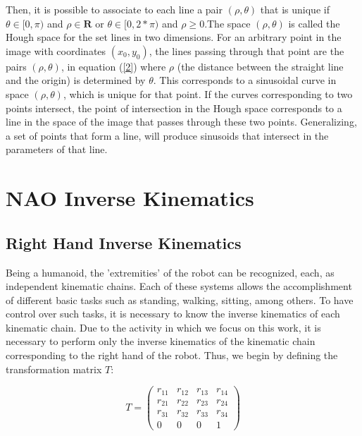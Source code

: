 \documentclass[conference]{IEEEtran}
\begin{document}
Then, it is possible to associate to each line a pair $(\rho,\theta)$ that is unique if $\theta \in [0,\pi)$ and $\rho \in \textbf{R}$ or $ \theta \in [0,2*\pi)$ and $\rho \geq 0$.The space $(\rho,\theta)$ is called the Hough space for the set lines in two dimensions. For an arbitrary point in the image with coordinates $(x_{0},y_{0})$, the lines passing through that point are the pairs $(\rho,\theta)$, in equation (\ref{2}) where $\rho$ (the distance between the straight line and the origin) is determined by $\theta$. This corresponds to a sinusoidal curve in space $(\rho,\theta)$, which is unique for that point. If the curves corresponding to two points intersect, the point of intersection in the Hough space corresponds to a line in the space of the image that passes through these two points. Generalizing, a set of points that form a line, will produce sinusoids that intersect in the parameters of that line.

\section{NAO Inverse Kinematics}
\subsection{Right Hand Inverse Kinematics}
Being a humanoid, the 'extremities' of the robot can be recognized, each, as independent kinematic chains. Each of these systems allows the accomplishment of different basic tasks such as standing, walking, sitting, among others. To have control over such tasks, it is necessary to know the inverse kinematics of each kinematic chain. Due to the activity in which we focus on this work, it is necessary to perform only the inverse kinematics of the kinematic chain corresponding to the right hand of the robot. Thus, we begin by defining the transformation matrix $T$:

\begin{equation}
T= 
\begin{pmatrix}
	r_{11}	& r_{12}	& r_{13}	&r_{14}\\
	r_{21}	& r_{22}	& r_{23}	&r_{24}\\
	r_{31}	& r_{32}	& r_{33}	&r_{34}\\
	0		& 0			& 0			& 1
\end{pmatrix}
\end{equation}
\end{document}
